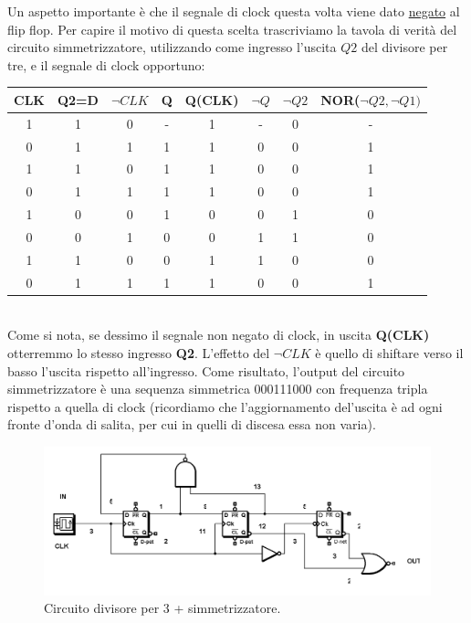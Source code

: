 \documentclass[journal, a4paper]{IEEEtran}
\begin{document}
Un aspetto importante è che il segnale di clock questa volta viene dato \underline{negato} al flip flop. Per capire il motivo di questa scelta trascriviamo la tavola di verità del circuito simmetrizzatore, utilizzando come ingresso l'uscita $Q2$ del divisore per tre, e il segnale di clock opportuno:


\begin{table}[h]
\centering
\begin{tabular}{c|c|c|c|c|c|c|c}
\hline \textbf{CLK} & \textbf{Q2=D} & \textbf{$\lnot CLK$} & \textbf{Q} & \textbf{Q(CLK)}& \textbf{$\lnot Q$} & \textbf{$\lnot Q2$} & \textbf{NOR($\lnot Q2, \lnot Q1)$} \\ 
\hline
 1 & 1 & 0 & -& 1& -& 0 & -\\ 
 0 & 1 & 1 & 1& 1& 0& 0 & 1\\
 1 & 1 & 0 & 1& 1& 0& 0 & 1\\ 
 0 & 1 & 1 & 1& 1& 0& 0 & 1\\ 
 1 & 0 & 0 & 1& 0& 0& 1 & 0\\
 0 & 0 & 1 & 0& 0& 1& 1 & 0\\
 1 & 1 & 0 & 0& 1& 1& 0 & 0\\
 0 & 1 & 1 & 1& 1& 0& 0 & 1\\
 \hline
\end{tabular} 
\end{table}
~\\

Come si nota, se dessimo il segnale non negato di clock, in uscita \textbf{Q(CLK)} otterremmo lo stesso ingresso \textbf{Q2}. L'effetto del $\lnot CLK$  è quello di shiftare verso il basso l'uscita rispetto all'ingresso. Come risultato, l'output del circuito simmetrizzatore è una sequenza simmetrica 000111000 con frequenza tripla rispetto a quella di clock (ricordiamo che l'aggiornamento del'uscita è ad ogni fronte d'onda di salita, per cui in quelli di discesa essa non varia).\\


\begin{figure}
\centering
\includegraphics[width=0.9\linewidth]{./es16_circ_simm}
\caption{Circuito divisore per 3 + simmetrizzatore.}
\label{fig:es16_circ_simm}
\end{figure}
\end{document}
